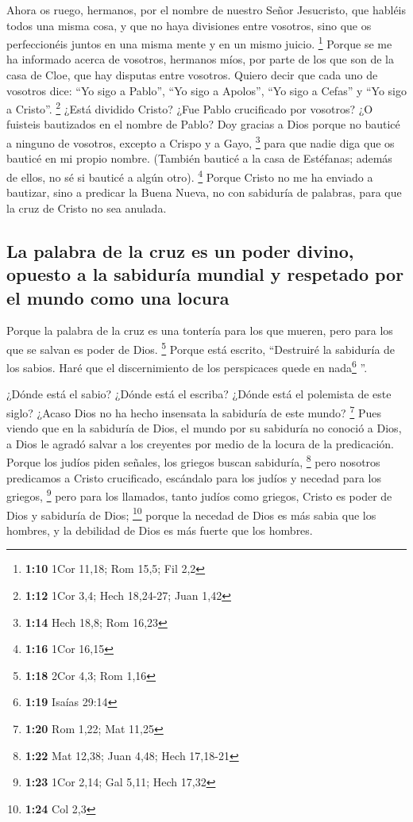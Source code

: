  Ahora os ruego, hermanos, por el nombre de nuestro Señor
Jesucristo, que habléis todos una misma cosa, y que no haya divisiones
entre vosotros, sino que os perfeccionéis juntos en una misma mente y en
un mismo juicio. \footnote{\textbf{1:10} 1Cor 11,18; Rom 15,5; Fil 2,2}
 Porque se me ha informado acerca de vosotros, hermanos
míos, por parte de los que son de la casa de Cloe, que hay disputas
entre vosotros.  Quiero decir que cada uno de vosotros
dice: ``Yo sigo a Pablo'', ``Yo sigo a Apolos'', ``Yo sigo a Cefas'' y
``Yo sigo a Cristo''. \footnote{\textbf{1:12} 1Cor 3,4; Hech 18,24-27;
  Juan 1,42}  ¿Está dividido Cristo? ¿Fue Pablo
crucificado por vosotros? ¿O fuisteis bautizados en el nombre de Pablo?
 Doy gracias a Dios porque no bauticé a ninguno de
vosotros, excepto a Crispo y a Gayo, \footnote{\textbf{1:14} Hech 18,8;
  Rom 16,23}  para que nadie diga que os bauticé en mi
propio nombre.  (También bauticé a la casa de Estéfanas;
además de ellos, no sé si bauticé a algún otro). \footnote{\textbf{1:16}
  1Cor 16,15}  Porque Cristo no me ha enviado a bautizar,
sino a predicar la Buena Nueva, no con sabiduría de palabras, para que
la cruz de Cristo no sea anulada.

\hypertarget{la-palabra-de-la-cruz-es-un-poder-divino-opuesto-a-la-sabiduruxeda-mundial-y-respetado-por-el-mundo-como-una-locura}{%
\subsection{La palabra de la cruz es un poder divino, opuesto a la
sabiduría mundial y respetado por el mundo como una
locura}\label{la-palabra-de-la-cruz-es-un-poder-divino-opuesto-a-la-sabiduruxeda-mundial-y-respetado-por-el-mundo-como-una-locura}}

 Porque la palabra de la cruz es una tontería para los
que mueren, pero para los que se salvan es poder de Dios. \footnote{\textbf{1:18}
  2Cor 4,3; Rom 1,16}  Porque está escrito, ``Destruiré
la sabiduría de los sabios. Haré que el discernimiento de los
perspicaces quede en nada\footnote{\textbf{1:19} Isaías 29:14} ''.

 ¿Dónde está el sabio? ¿Dónde está el escriba? ¿Dónde
está el polemista de este siglo? ¿Acaso Dios no ha hecho insensata la
sabiduría de este mundo? \footnote{\textbf{1:20} Rom 1,22; Mat 11,25}
 Pues viendo que en la sabiduría de Dios, el mundo por su
sabiduría no conoció a Dios, a Dios le agradó salvar a los creyentes por
medio de la locura de la predicación.  Porque los judíos
piden señales, los griegos buscan sabiduría, \footnote{\textbf{1:22} Mat
  12,38; Juan 4,48; Hech 17,18-21}  pero nosotros
predicamos a Cristo crucificado, escándalo para los judíos y necedad
para los griegos, \footnote{\textbf{1:23} 1Cor 2,14; Gal 5,11; Hech
  17,32}  pero para los llamados, tanto judíos como
griegos, Cristo es poder de Dios y sabiduría de Dios; \footnote{\textbf{1:24}
  Col 2,3}  porque la necedad de Dios es más sabia que
los hombres, y la debilidad de Dios es más fuerte que los hombres.

